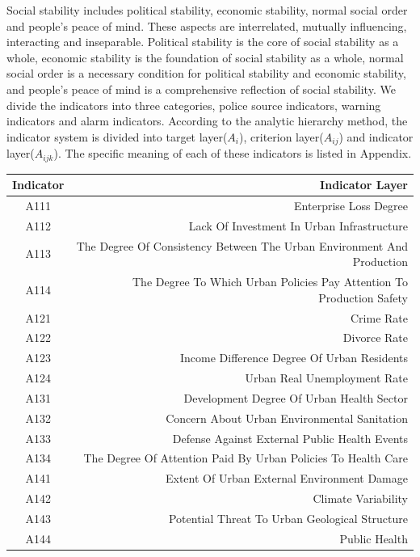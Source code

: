 \documentclass[12pt]{article}  %
\begin{document}
Social stability includes political stability, economic stability, normal social order and people's peace of mind. These aspects are interrelated, mutually influencing, interacting and inseparable. Political stability is the core of social stability as a whole, economic stability is the foundation of social stability as a whole, normal social order is a necessary condition for political stability and economic stability, and people's peace of mind is a comprehensive reflection of social stability. We divide the indicators into three categories, police source indicators, warning indicators and alarm indicators. According to the analytic hierarchy method, the indicator system is divided into target layer($A_i$), criterion layer($A_{ij}$) and indicator layer($A_{ijk}$). The specific meaning of each of these indicators is listed in Appendix.
\begin{table}[!ht]
    \centering
    \begin{tabular}{cr}
        \hline
        Indicator & Indicator Layer  \\ \hline
        A111 & Enterprise Loss Degree  \\ 
        A112 & Lack Of Investment In Urban Infrastructure  \\ 
        A113 & The Degree Of Consistency Between The Urban Environment And Production  \\ 
        A114 & The Degree To Which Urban Policies Pay Attention To Production Safety  \\ 
        A121 & Crime Rate  \\ 
        A122 & Divorce Rate  \\ 
        A123 & Income Difference Degree Of Urban Residents  \\ 
        A124 & Urban Real Unemployment Rate  \\ 
        A131 & Development Degree Of Urban Health Sector  \\ 
        A132 & Concern About Urban Environmental Sanitation  \\ 
        A133 & Defense Against External Public Health Events  \\ 
        A134 & The Degree Of Attention Paid By Urban Policies To Health Care  \\ 
        A141 & Extent Of Urban External Environment Damage  \\ 
        A142 & Climate Variability  \\ 
        A143 & Potential Threat To Urban Geological Structure  \\ 
        A144 &  Public Health \\ 

\end{tabular}
\end{table}
\end{document}
